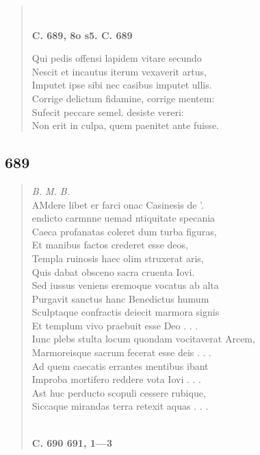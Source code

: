 \documentclass[11pt, a4paper]{report}
\begin{document}
\begin{verse}
        ﻿\pagebreak 
     \marginpar{[166]} \begin{center} \textbf{C. 689, 8o s5. C. 689} \end{center}Qui pedis offensi lapidem vitare secundo \\ Nescit et incautus iterum vexaverit artus, \\ Imputet ipse sibi nec casibus imputet ullis. \\ Corrige delictum fidamine, corrige mentem: \\ Sufecit peccare semel. desiste vereri: \\ Non erit in culpa, quem paenitet ante fuisse. \\ 
      \end{verse}
  
            \subsection*{689}
      \begin{verse}
      \textit{B. M. B.} \\ AMdere libet er farci onac Casinesis de ’. \\ endicto carmnne uemad ntiquitate specania \\ Caeca profanatas coleret dum turba figuras, \\ Et manibus factos crederet esse deos, \\ Templa ruinosis haec olim struxerat aris, \\ Quis dabat obsceno sacra cruenta Iovi. \\ Sed iussus veniens eremoque vocatus ab alta \\ Purgavit sanctus hanc Benedictus humum \\ Sculptaque confractis deiecit marmora signis \\ Et templum vivo praebuit esse Deo . . . \\ Iunc plebs stulta locum quondam vocitaverat Arcem, \\ Marmoreisque sacrum fecerat esse deis . . . \\ Ad quem caecatis errantes mentibus ibant \\ Improba mortifero reddere vota Iovi . . . \\ Ast huc perducto scopuli cessere rubique, \\ Siccaque mirandas terra retexit aquas . . . \\ 
        ﻿\pagebreak 
    \begin{center} \textbf{C. 690 691, 1—3} \end{center} \marginpar{[167]} 
      \end{verse}
  
\end{document}

